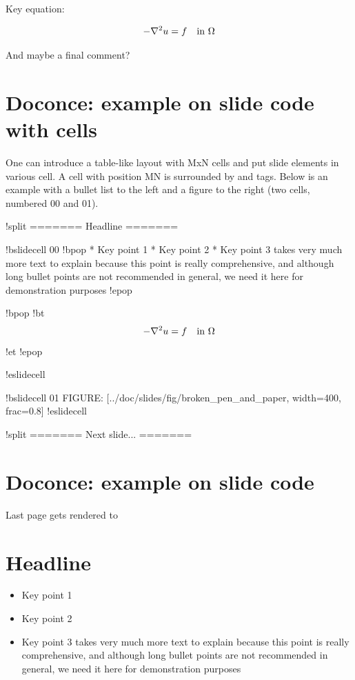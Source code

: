 \documentclass[%
oneside,                 %
final,                   %
chapterprefix=true,      %
open=right               %
10pt]{book}
\begin{document}
Key equation:

\[ -\nabla^2 u = f \quad\hbox{in }\Omega \]

And maybe a final comment?

\section{Doconce: example on slide code with cells}

One can introduce a table-like layout with MxN cells and
put slide elements in various cell. A cell with position
MN is surrounded by  and 
tags. Below is an example with a bullet list to the left and
a figure to the right (two cells, numbered 00 and 01).

\bccq
!split
======= Headline =======

!bslidecell 00
!bpop
 * Key point 1
 * Key point 2
 * Key point 3 takes very much more text to explain because
   this point is really comprehensive, and although long
   bullet points are not recommended in general, we need
   it here for demonstration purposes
!epop

!bpop
!bt
\[ -\nabla^2 u = f \quad\hbox{in }\Omega \]
!et
!epop

!eslidecell

!bslidecell 01
FIGURE: [../doc/slides/fig/broken_pen_and_paper, width=400, frac=0.8]
!eslidecell

!split
======= Next slide... =======
\eccq

\section{Doconce: example on slide code}

Last page gets rendered to

\section{Headline}

\begin{itemize}
 \item Key point 1

 \item Key point 2

 \item Key point 3 takes very much more text to explain because
   this point is really comprehensive, and although long
   bullet points are not recommended in general, we need
   it here for demonstration purposes
\end{itemize}
\end{document}
